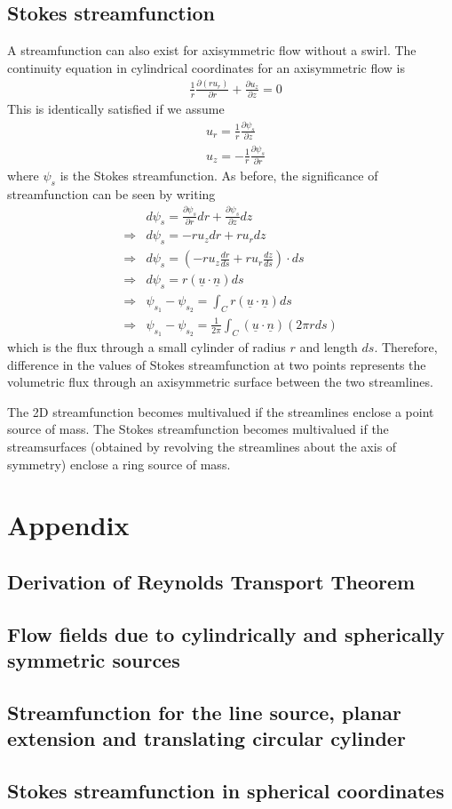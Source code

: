\documentclass[11pt,a4paper]{article}
\newcommand{\pd}[2]{\frac{\partial #1}{\partial #2}}
\newcommand{\vect}[1]{\underline{#1}}
\newcommand{\1}{\vect{1}}
\newcommand{\RA}{\Rightarrow}
\begin{document}
\subsection{Stokes streamfunction}
A streamfunction can also exist for axisymmetric flow without a swirl. The continuity equation in cylindrical coordinates for an axisymmetric flow is
\begin{align*}
&\frac{1}{r}\pd{(ru_r)}{r} + \pd{u_z}{z} = 0
\end{align*}
This is identically satisfied if we assume
\begin{align*}
&u_r = \frac{1}{r}\pd{\psi_s}{z}\\
&u_z = -\frac{1}{r}\pd{\psi_s}{r}
\end{align*}
where $\psi_s$ is the Stokes streamfunction. As before, the significance of streamfunction can be seen by writing
\begin{align*}
&d\psi_s = \pd{\psi_s}{r}dr + \pd{\psi_s}{z}dz\\
\RA& d\psi_s = - r u_z dr + r u_r dz\\
\RA& d\psi_s = (- r u_z \frac{dr}{ds} + r u_r \frac{dz}{ds}) \cdot ds\\
\RA& d\psi_s = r (\vect u \cdot \vect n) ds\\
\RA& \psi_{s_1} - \psi_{s_2} = \int_C r (\vect u \cdot \vect n) ds\\
\RA& \psi_{s_1} - \psi_{s_2} = \frac{1}{2\pi}\int_C (\vect u \cdot \vect n)(2\pi r ds)
\end{align*}
which is the flux through a small cylinder of radius $r$ and length $ds$. Therefore, difference in the values of Stokes streamfunction at two points represents the volumetric flux through an axisymmetric surface between the two streamlines.

The 2D streamfunction becomes multivalued if the streamlines enclose a point source of mass. The Stokes streamfunction becomes multivalued if the streamsurfaces (obtained by revolving the streamlines about the axis of symmetry) enclose a ring source of mass. 

\newpage
\section{Appendix}

\subsection{Derivation of Reynolds Transport Theorem}
\subsection{Flow fields due to cylindrically and spherically symmetric sources}
\subsection{Streamfunction for the line source, planar extension and translating circular cylinder}
\subsection{Stokes streamfunction in spherical coordinates}
\end{document}
